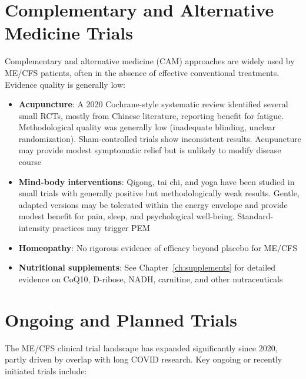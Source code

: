 \section{Complementary and Alternative Medicine Trials}
\label{sec:trials-cam}

Complementary and alternative medicine (CAM) approaches are widely used by ME/CFS patients, often in the absence of effective conventional treatments. Evidence quality is generally low:

\begin{itemize}
    \item \textbf{Acupuncture}: A 2020 Cochrane-style systematic review identified several small RCTs, mostly from Chinese literature, reporting benefit for fatigue. Methodological quality was generally low (inadequate blinding, unclear randomization). Sham-controlled trials show inconsistent results. Acupuncture may provide modest symptomatic relief but is unlikely to modify disease course
    \item \textbf{Mind-body interventions}: Qigong, tai chi, and yoga have been studied in small trials with generally positive but methodologically weak results. Gentle, adapted versions may be tolerated within the energy envelope and provide modest benefit for pain, sleep, and psychological well-being. Standard-intensity practices may trigger PEM
    \item \textbf{Homeopathy}: No rigorous evidence of efficacy beyond placebo for ME/CFS
    \item \textbf{Nutritional supplements}: See Chapter~\ref{ch:supplements} for detailed evidence on CoQ10, D-ribose, NADH, carnitine, and other nutraceuticals
\end{itemize}

\section{Ongoing and Planned Trials}
\label{sec:trials-ongoing}

The ME/CFS clinical trial landscape has expanded significantly since 2020, partly driven by overlap with long COVID research. Key ongoing or recently initiated trials include:

